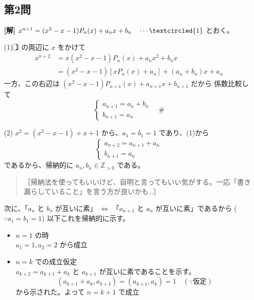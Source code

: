 \documentclass[../main.tex]{subfiles}
\begin{document}
\newpage

\subsection*{第2問}

\noindent
\textbf{[解]} $x^{n+1} = (x^2-x-1) P_n(x) + a_n x + b_n \quad \cdots \textcircled{1}$ とおく。

\bigskip

\noindent
(1) \textcircled{1} の両辺に $x$ をかけて
\begin{align*}
  x^{n+2} &= x(x^2-x-1) P_n(x) + a_n x^2 + b_n x \\
  &= (x^2-x-1) [x P_n(x) + a_n] + (a_n + b_n) x + a_n
\end{align*}
一方、この右辺は $(x^2-x-1) P_{n+1}(x) + a_{n+1} x + b_{n+1}$ だから 係数比較して
\[
  \begin{cases}
    a_{n+1} = a_n + b_n \\
    b_{n+1} = a_n
  \end{cases} \quad \text{\#}
\]

\bigskip

\noindent
(2) $x^2 = (x^2-x-1) + x + 1$ から、$a_1 = b_1 = 1$ であり、(1)から
\[
  \begin{cases}
    a_{n+2} = a_{n+1} + a_n \\
    b_{n+1} = a_n
  \end{cases}
\]
であるから、帰納的に $a_n, b_n \in \mathbb{Z}_{>0}$ である。

\begin{quote}
  \small
  ［帰納法を使ってもいいけど、自明と言ってもいい気がする。一応「書き漏らしていること」を言う方が良いかも\dots］
\end{quote}

\noindent
次に、「$a_n$ と $b_n$ が互いに素」 $\iff$ 「$a_{n+1}$ と $a_n$ が互いに素」であるから ($\because a_1 = b_1 = 1$) 以下これを帰納的に示す。

\begin{itemize}
  \item[$1^\circ$] $n=1$ の時\\
    $a_1=1, a_2=2$ から成立
  \item[$2^\circ$] $n=k$ での成立仮定\\
    $a_{k+2} = a_{k+1} + a_k$ と $a_{k+1}$ が互いに素であることを示す。
    \[
      (a_{k+1} + a_k, a_{k+1}) = (a_{k+1}, a_k) = 1 \quad (\because \text{仮定})
    \]
    から示された。よって $n=k+1$ で成立
\end{itemize}
\end{document}
